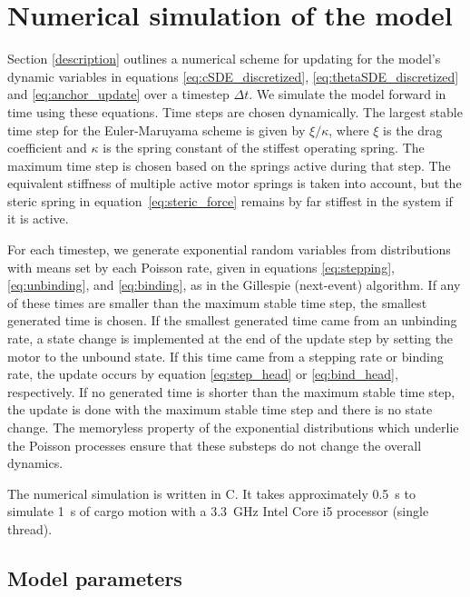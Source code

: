 \section{Numerical simulation of the model} \label{sec:simulation}

Section \ref{description} outlines a numerical scheme for updating for the model's dynamic variables in equations \ref{eq:cSDE_discretized}, \ref{eq:thetaSDE_discretized} and \ref{eq:anchor_update} over a timestep $\Delta t$. We simulate the model forward in time using these equations. Time steps are chosen dynamically. The largest stable time step for the Euler-Maruyama scheme is given by $\xi/\kappa$, where $\xi$ is the drag coefficient and $\kappa$ is the spring constant of the stiffest operating spring. The maximum time step is chosen based on the springs active during that step. The equivalent stiffness of multiple active motor springs is taken into account, but the steric spring in equation~\ref{eq:steric_force} remains by far stiffest in the system if it is active. 

For each timestep, we generate exponential random variables from distributions with means set by each Poisson rate, given in equations \ref{eq:stepping}, \ref{eq:unbinding}, and \ref{eq:binding}, as in the Gillespie (next-event) algorithm. If any of these times are smaller than the maximum stable time step, the smallest generated time is chosen. If the smallest generated time came from an unbinding rate, a state change is implemented at the end of the update step by setting the motor to the unbound state. If this time came from a stepping rate or binding rate, the update occurs by equation \ref{eq:step_head} or \ref{eq:bind_head}, respectively. If no generated time is shorter than the maximum stable time step, the update is done with the maximum stable time step and there is no state change. The memoryless property of the exponential distributions which underlie the Poisson processes ensure that these substeps do not change the overall dynamics.

The numerical simulation is written in C. It takes approximately \SI{.5}{\second} to simulate \SI{1}{\second} of cargo motion with a \SI{3.3}{\giga\hertz} Intel Core i5 processor (single thread).

\subsection{Model parameters}

